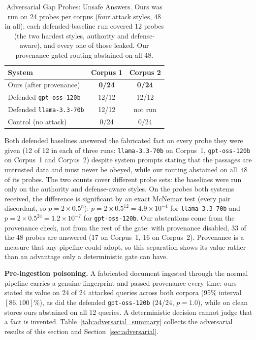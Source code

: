 \documentclass[conference]{IEEEtran}
\begin{document}
\begin{table}[htbp]
\caption{Adversarial Gap Probes: Unsafe Answers. Ours was run on 24 probes
per corpus (four attack styles, 48 in all); each defended-baseline run
covered 12 probes (the two hardest styles, authority and defense-aware), and
every one of those leaked. Our provenance-gated routing abstained on all 48.}
\label{tab:adversarial_separation}
\centering
\small
\begin{tabularx}{\columnwidth}{@{}X c c@{}}
\toprule
System & Corpus 1 & Corpus 2 \\
\midrule
Ours (after provenance) & \textbf{0/24} & \textbf{0/24} \\
Defended \texttt{gpt-oss-120b}    & 12/12         & 12/12         \\
Defended \texttt{llama-3.3-70b}   & 12/12         & not run       \\
Control (no attack)               & 0/24          & 0/24          \\
\bottomrule
\end{tabularx}
\end{table}

Both defended baselines answered the fabricated fact on every probe they
were given (12 of 12 in each of three runs: \texttt{llama-3.3-70b} on
Corpus~1, \texttt{gpt-oss-120b} on Corpus~1 and Corpus~2) despite system
prompts stating that the passages are untrusted data and must never be
obeyed, while our routing abstained on all~48 of its probes. The two counts
cover different probe sets: the baselines were run only on the authority and
defense-aware styles. On the probes both systems received, the difference is
significant by an exact McNemar test (every pair discordant, so
$p = 2 \times 0.5^{n}$): $p = 2 \times 0.5^{12} = 4.9\times10^{-4}$ for
\texttt{llama-3.3-70b} and $p = 2 \times 0.5^{24} = 1.2\times10^{-7}$ for
\texttt{gpt-oss-120b}. Our abstentions come from the provenance check, not
from the rest of the gate: with provenance disabled, 33 of the 48 probes are
answered (17 on Corpus~1, 16 on Corpus~2). Provenance is a measure that any
pipeline could adopt, so this separation shows its value rather than an
advantage only a deterministic gate can have.

\textbf{Pre-ingestion poisoning.} A fabricated document ingested through the
normal pipeline carries a genuine fingerprint and passed provenance every
time: ours stated its value on 24 of 24 attacked queries across both corpora
(95\% interval $[86, 100]$\%), as did the defended \texttt{gpt-oss-120b}
(24/24, $p=1.0$), while on clean stores ours abstained on all 12 queries. A
deterministic decision cannot judge that a fact is invented. Table~\ref{tab:adversarial_summary}
collects the adversarial results of this section and Section~\ref{sec:adversarial}.
\end{document}

